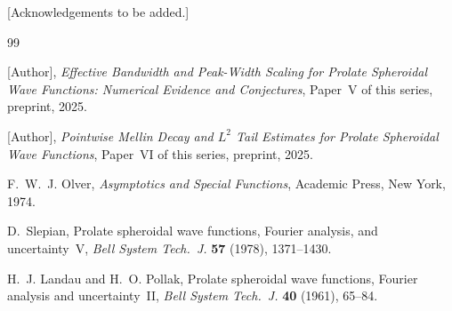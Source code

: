 \documentclass[12pt,a4paper]{amsart}
\theoremstyle{definition}
\theoremstyle{remark}
\begin{document}
[Acknowledgements to be added.]

\begin{thebibliography}{99}

[Author],
\textit{Effective Bandwidth and Peak-Width
Scaling for Prolate Spheroidal Wave Functions:
Numerical Evidence and Conjectures},
Paper~V of this series, preprint, 2025.

[Author],
\textit{Pointwise Mellin Decay and
$L^2$ Tail Estimates for Prolate Spheroidal
Wave Functions},
Paper~VI of this series, preprint, 2025.

F.~W.~J. Olver,
\textit{Asymptotics and Special Functions},
Academic Press, New York, 1974.

D.~Slepian,
Prolate spheroidal wave functions, Fourier
analysis, and uncertainty~V,
\textit{Bell System Tech.~J.}
\textbf{57} (1978), 1371--1430.

H.~J. Landau and H.~O. Pollak,
Prolate spheroidal wave functions, Fourier
analysis and uncertainty~II,
\textit{Bell System Tech.~J.}
\textbf{40} (1961), 65--84.

\end{thebibliography}
\end{document}
